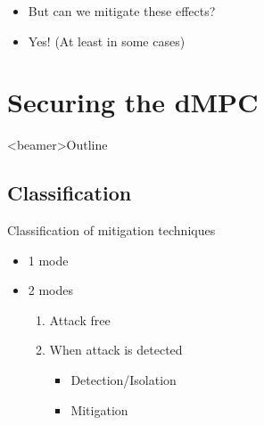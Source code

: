 \documentclass[aspectratio=169]{beamer}
\begin{document}
\begin{frame}{}
  \begin{itemize}[<+(1)->]
    \item But can we mitigate these effects?
    \item Yes! (At least in some cases)
  \end{itemize}
\end{frame}

\section{Securing the dMPC}

\begin{frame}<beamer>{Outline}
  \tableofcontents[sectionstyle=show/hide,subsectionstyle=show/show/show,subsubsectionstyle=hide]
\end{frame}

\subsection{Classification}

\begin{frame}{Classification of mitigation techniques}
  \begin{minipage}[t]{.45\linewidth}
    \begin{itemize}
      \item<2-> 1 mode
    \end{itemize}
  \end{minipage}
  \hfill
  \begin{minipage}[t]{.45\linewidth}
    \begin{itemize}
      \item<2-> 2 modes
            \begin{enumerate}
              \item<3-> Attack free
              \item<3-> When attack is detected
                    \begin{itemize}
                      \item<4-> Detection/Isolation
                      \item<4-> Mitigation
                    \end{itemize}
            \end{enumerate}
    \end{itemize}
  \end{minipage}
\end{frame}
\end{document}
